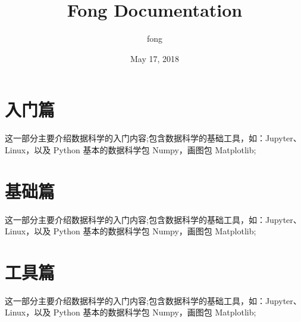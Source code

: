 \documentclass[letterpaper,10pt,english]{sphinxmanual}
\title{Fong Documentation}
\date{May 17, 2018}
\author{fong}
\begin{document}
\maketitle
\sphinxtableofcontents
{}\label{\detokenize{index::doc}}



\chapter{入门篇}
\label{\detokenize{beginning/index::doc}}\label{\detokenize{beginning/index:id1}}
这一部分主要介绍数据科学的入门内容;包含数据科学的基础工具，如：Jupyter、Linux，以及 Python 基本的数据科学包 Numpy，画图包 Matplotlib;


\chapter{基础篇}
\label{\detokenize{base/index::doc}}\label{\detokenize{base/index:id1}}
这一部分主要介绍数据科学的入门内容;包含数据科学的基础工具，如：Jupyter、Linux，以及 Python 基本的数据科学包 Numpy，画图包 Matplotlib;


\chapter{工具篇}
\label{\detokenize{tool/index::doc}}\label{\detokenize{tool/index:id1}}
这一部分主要介绍数据科学的入门内容;包含数据科学的基础工具，如：Jupyter、Linux，以及 Python 基本的数据科学包 Numpy，画图包 Matplotlib;



\renewcommand{\indexname}{Index}
\printindex
\end{document}
